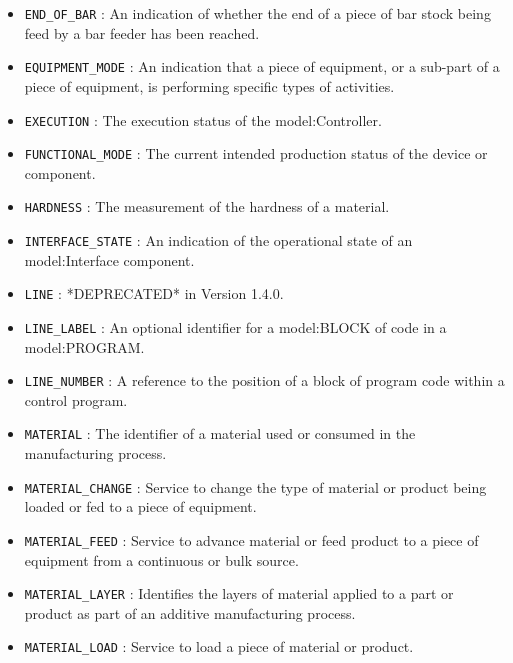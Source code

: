 \begin{itemize}
\item \texttt{END_OF_BAR} : An indication of whether the end of a piece of bar stock being feed by a bar feeder has been reached. 

\item \texttt{EQUIPMENT_MODE} : An indication that a piece of equipment, or a sub-part of a piece of equipment, is performing specific types of activities. 

\item \texttt{EXECUTION} : The execution status of the {model:Controller}. 

\item \texttt{FUNCTIONAL_MODE} : The current intended production status of the device or component. 

\item \texttt{HARDNESS} : The measurement of the hardness of a material. 

\item \texttt{INTERFACE_STATE} : An indication of the operational state of an {model:Interface} component. 

\item \texttt{LINE} : *DEPRECATED* in Version 1.4.0. 

\item \texttt{LINE_LABEL} : An optional identifier for a {model:BLOCK} of code in a {model:PROGRAM}. 

\item \texttt{LINE_NUMBER} : A reference to the position of a block of program code within a control program. 

\item \texttt{MATERIAL} : The identifier of a material used or consumed in the manufacturing process. 

\item \texttt{MATERIAL_CHANGE} : Service to change the type of material or product being loaded or fed to a piece of equipment. 

\item \texttt{MATERIAL_FEED} : Service to advance material or feed product to a piece of equipment from a continuous or bulk source. 

\item \texttt{MATERIAL_LAYER} : Identifies the layers of material applied to a part or product as part of an additive manufacturing process. 

\item \texttt{MATERIAL_LOAD} : Service to load a piece of material or product. 


\end{itemize}
